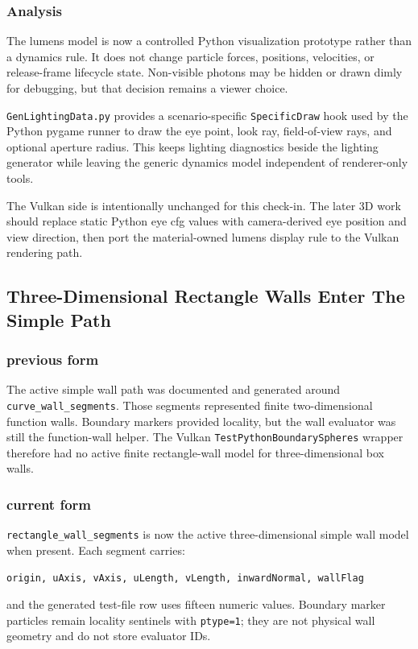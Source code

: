 \subsubsection{Analysis}

The lumens model is now a controlled Python visualization prototype rather
than a dynamics rule.  It does not change particle forces, positions,
velocities, or release-frame lifecycle state.  Non-visible photons may be
hidden or drawn dimly for debugging, but that decision remains a viewer
choice.

\texttt{GenLightingData.py} provides a scenario-specific
\texttt{SpecificDraw} hook used by the Python pygame runner to draw the eye
point, look ray, field-of-view rays, and optional aperture radius.  This keeps
lighting diagnostics beside the lighting generator while leaving the generic
dynamics model independent of renderer-only tools.

The Vulkan side is intentionally unchanged for this check-in.  The later 3D
work should replace static Python eye cfg values with camera-derived eye
position and view direction, then port the material-owned lumens display rule
to the Vulkan rendering path.

\subsection{Three-Dimensional Rectangle Walls Enter The Simple Path}

\subsubsection{previous form}

The active simple wall path was documented and generated around
\texttt{curve\_wall\_segments}.  Those segments represented finite
two-dimensional function walls.  Boundary markers provided locality, but the
wall evaluator was still the function-wall helper.  The Vulkan
\texttt{TestPythonBoundarySpheres} wrapper therefore had no active finite
rectangle-wall model for three-dimensional box walls.

\subsubsection{current form}

\texttt{rectangle\_wall\_segments} is now the active three-dimensional simple
wall model when present.  Each segment carries:
\begin{verbatim}
origin, uAxis, vAxis, uLength, vLength, inwardNormal, wallFlag
\end{verbatim}
and the generated test-file row uses fifteen numeric values.  Boundary marker
particles remain locality sentinels with \texttt{ptype=1}; they are not
physical wall geometry and do not store evaluator IDs.

